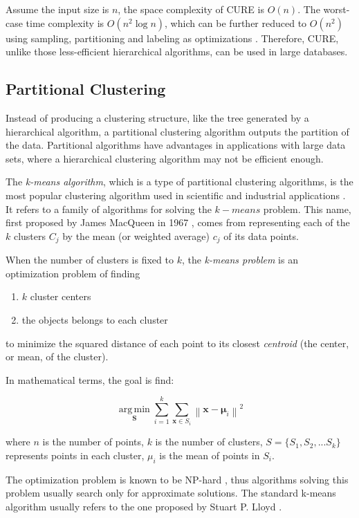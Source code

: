 \documentclass[conference]{IEEEtran}
\begin{document}
Assume the input size is $n$, the space complexity of CURE is $O(n)$. The worst-case time complexity is $O(n^{2}\log n)$, which can be further reduced to $O(n^{2})$ using sampling, partitioning and labeling as optimizations \cite{gan2007data}. Therefore, CURE, unlike those less-efficient hierarchical algorithms, can be used in large databases.

\subsection{Partitional Clustering}
Instead of producing a clustering structure, like the tree generated by a hierarchical algorithm, a partitional clustering algorithm outputs the partition of the data. Partitional algorithms have advantages in applications with large data sets, where a hierarchical clustering algorithm may not be efficient enough.

The \textit{k-means algorithm}, which is a type of partitional clustering algorithms, is the most popular clustering algorithm used in scientific and industrial applications \cite{wang2006encyclopedia}. It refers to a family of algorithms for solving the $k-means$ problem. This name, first proposed by James MacQueen in 1967 \cite{macqueen1967some}, comes from representing each of the $k$ clusters $C_{j}$ by the mean (or weighted average) $c_{j}$ of its data points.

When the number of clusters is fixed to $k$, the \textit{k-means problem} is an optimization problem of finding
\begin{enumerate}
\item $k$ cluster centers
\item the objects belongs to each cluster
\end{enumerate}
to minimize the squared distance of each point to its closest \textit{centroid} (the center, or mean, of the cluster).

In mathematical terms, the goal is find:

$$ \underset{\mathbf{S}}{\operatorname{arg\,min}} \sum_{i=1}^{k} \sum_{\mathbf x \in S_i} \left\| \mathbf x - \boldsymbol\mu_i \right\|^2
$$

where $n$ is the number of points, $k$ is the number of clusters, $S = \{S_1, S_2, ... S_k\}$ represents points in each cluster, $\mu_i$ is the mean of points in $S_i$.

The optimization problem is known to be NP-hard \cite{mahajan2009planar}, thus algorithms solving this problem usually search only for approximate solutions. The standard k-means algorithm usually refers to the one proposed by Stuart P. Lloyd \cite{lloyd1982least}.
\end{document}
